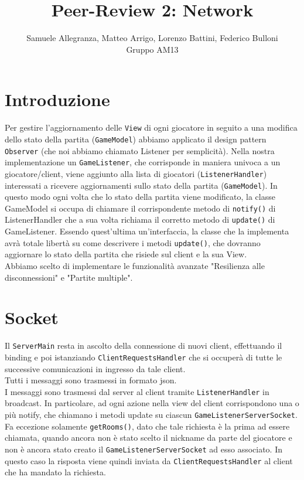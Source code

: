 \documentclass[12pt]{article}
\title{Peer-Review 2: Network}
\author{Samuele Allegranza, Matteo Arrigo, Lorenzo Battini, Federico Bulloni\\Gruppo AM13}
\begin{document}
\maketitle

\section{Introduzione} %
Per gestire l'aggiornamento delle \texttt{View} di ogni giocatore in seguito a una modifica dello stato della partita (\texttt{GameModel}) abbiamo applicato il design pattern \texttt{Observer} (che noi abbiamo chiamato Listener per semplicità). Nella nostra implementazione un \texttt{GameListener}, che corrisponde in maniera univoca a un giocatore/client, viene aggiunto alla lista di giocatori (\texttt{ListenerHandler}) interessati a ricevere aggiornamenti sullo stato della partita (\texttt{GameModel}). In questo modo ogni volta che lo stato della partita viene modificato, la classe GameModel si occupa di chiamare il corrispondente metodo di \texttt{notify()} di ListenerHandler che a sua volta richiama il corretto metodo di \texttt{update()} di GameListener. Essendo quest'ultima un'interfaccia, la classe che la implementa avrà totale libertà su come descrivere i metodi \texttt{update()}, che dovranno aggiornare lo stato della partita che risiede sul client e la sua View.
\\
Abbiamo scelto di implementare le funzionalità avanzate "Resilienza alle disconnessioni" e "Partite multiple". 
\section{Socket}
Il \texttt{ServerMain} resta in ascolto della connessione di nuovi client, effettuando il binding e poi istanziando \texttt{ClientRequestsHandler} che si occuperà di tutte le successive comunicazioni in ingresso da tale client.
\\
Tutti i messaggi sono trasmessi in formato json.
\\
I messaggi sono trasmessi dal server al client tramite \texttt{ListenerHandler} in broadcast. In particolare, ad ogni azione nella view del client corrispondono una o più notify, che chiamano i metodi update su ciascun \texttt{GameListenerServerSocket}.
\\
Fa eccezione solamente \texttt{getRooms()}, dato che tale richiesta è la prima ad essere chiamata, quando ancora non è stato scelto il nickname da parte del giocatore e non è ancora stato creato il \texttt{GameListenerServerSocket} ad esso associato. In questo caso la risposta viene quindi inviata da \texttt{ClientRequestsHandler} al client che ha mandato la richiesta.
\end{document}
